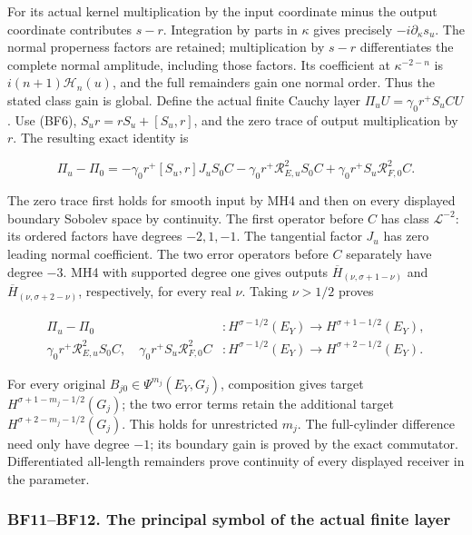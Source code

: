 \documentclass[
  11pt,
]{article}
\begin{document}
For its actual kernel multiplication by the input coordinate minus the
output coordinate contributes \(s-r\). Integration by parts in
\(\kappa\) gives precisely \(-i\partial_\kappa s_u\). The normal
properness factors are retained; multiplication by \(s-r\)
differentiates the complete normal amplitude, including those factors.
Its coefficient at \(\kappa^{-2-n}\) is \(i(n+1)\mathcal H_n(u)\), and
the full remainders gain one normal order. Thus the stated class gain is
global. Define the actual finite Cauchy layer
\(\Pi_u U=\gamma_0r^+S_uCU\). Use (BF6), \(S_ur=rS_u+[S_u,r]\), and the
zero trace of output multiplication by \(r\). The resulting exact
identity is

\[
 \boxed{\displaystyle
 \Pi_u-\Pi_0
 =-\gamma_0r^+[S_u,r]J_uS_0C
   -\gamma_0r^+\mathcal R_{E,u}^2S_0C
   +\gamma_0r^+S_u\mathcal R_{F,0}^2C.}
 \tag{BF9}
\]

The zero trace first holds for smooth input by MH4 and then on every
displayed boundary Sobolev space by continuity. The first operator
before \(C\) has class \(\mathcal L^{-2}\): its ordered factors have
degrees \(-2,1,-1\). The tangential factor \(J_u\) has zero leading
normal coefficient. The two error operators before \(C\) separately have
degree \(-3\). MH4 with supported degree one gives outputs
\(\overline H_{(\nu,\sigma+1-\nu)}\) and
\(\overline H_{(\nu,\sigma+2-\nu)}\), respectively, for every real
\(\nu\). Taking \(\nu>1/2\) proves

\[
 \begin{aligned}
 \Pi_u-\Pi_0 &:H^{\sigma-1/2}(E_Y)\to H^{\sigma+1-1/2}(E_Y),\\
 \gamma_0r^+\mathcal R_{E,u}^2S_0C,
 \quad\gamma_0r^+S_u\mathcal R_{F,0}^2C
 &:H^{\sigma-1/2}(E_Y)\to H^{\sigma+2-1/2}(E_Y).
 \end{aligned}
 \tag{BF10}
\]

For every original \(B_{j0}\in\Psi^{m_j}(E_Y,G_j)\), composition gives
target \(H^{\sigma+1-m_j-1/2}(G_j)\); the two error terms retain the
additional target \(H^{\sigma+2-m_j-1/2}(G_j)\). This holds for
unrestricted \(m_j\). The full-cylinder difference need only have degree
\(-1\); its boundary gain is proved by the exact commutator.
Differentiated all-length remainders prove continuity of every displayed
receiver in the parameter.

\subsubsection{BF11--BF12. The principal symbol of the actual finite
layer}\label{bf11bf12.-the-principal-symbol-of-the-actual-finite-layer}
\end{document}
